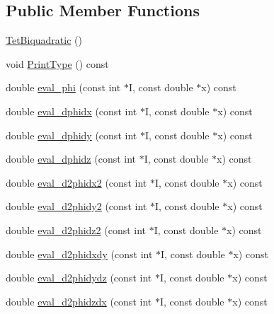 \subsection*{Public Member Functions}
\begin{DoxyCompactItemize}
\item 
\mbox{\hyperlink{classfemus_1_1_tet_biquadratic_a0aa95b56d46aecf212d6c0b7b0a8ee3b}{Tet\+Biquadratic}} ()
\item 
void \mbox{\hyperlink{classfemus_1_1_tet_biquadratic_a2ada2728eefe378323b74924a2c4b4c8}{Print\+Type}} () const
\item 
double \mbox{\hyperlink{classfemus_1_1_tet_biquadratic_a4f5066f00ab4577ab2fbdff72b47b4a0}{eval\+\_\+phi}} (const int $\ast$I, const double $\ast$x) const
\item 
double \mbox{\hyperlink{classfemus_1_1_tet_biquadratic_afd1125cd520a11a911a596785b75ce4d}{eval\+\_\+dphidx}} (const int $\ast$I, const double $\ast$x) const
\item 
double \mbox{\hyperlink{classfemus_1_1_tet_biquadratic_a00d710cd64c43aab218a91dced7436c8}{eval\+\_\+dphidy}} (const int $\ast$I, const double $\ast$x) const
\item 
double \mbox{\hyperlink{classfemus_1_1_tet_biquadratic_a9e6a9c61044c0cc4ab68ea0ef6e83f80}{eval\+\_\+dphidz}} (const int $\ast$I, const double $\ast$x) const
\item 
double \mbox{\hyperlink{classfemus_1_1_tet_biquadratic_ad6fb5a8574508b0e45e49ca891ec3aac}{eval\+\_\+d2phidx2}} (const int $\ast$I, const double $\ast$x) const
\item 
double \mbox{\hyperlink{classfemus_1_1_tet_biquadratic_a2095b54326d389269cd4fff0724138aa}{eval\+\_\+d2phidy2}} (const int $\ast$I, const double $\ast$x) const
\item 
double \mbox{\hyperlink{classfemus_1_1_tet_biquadratic_a416f03147427a322d96feb511dd6c6d0}{eval\+\_\+d2phidz2}} (const int $\ast$I, const double $\ast$x) const
\item 
double \mbox{\hyperlink{classfemus_1_1_tet_biquadratic_af239043a31782f74d867ecbb4f654689}{eval\+\_\+d2phidxdy}} (const int $\ast$I, const double $\ast$x) const
\item 
double \mbox{\hyperlink{classfemus_1_1_tet_biquadratic_a55de22b4a8a1d393548efcfa8f5a20c6}{eval\+\_\+d2phidydz}} (const int $\ast$I, const double $\ast$x) const
\item 
double \mbox{\hyperlink{classfemus_1_1_tet_biquadratic_a88998aa6e589aa3919cde8c5eb1ad46d}{eval\+\_\+d2phidzdx}} (const int $\ast$I, const double $\ast$x) const
\end{DoxyCompactItemize}
